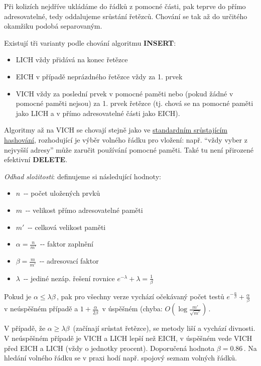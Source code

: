 Při kolizích nejdříve ukládáme do řádků z pomocné části, pak teprve do
přímo adresovatelné, tedy oddalujeme srůstání řetězců. Chování se tak až
do určitého okamžiku podobá separovaným.

Existují tři varianty podle chování algoritmu \textbf{INSERT}:

\begin{itemize}
\tightlist
\item
  LICH vždy přidává na konec řetězce
\item
  EICH v případě neprázdného řetězce vždy za 1. prvek
\item
  VICH vždy za poslední prvek v pomocné paměti nebo (pokud žádné v
  pomocné paměti nejsou) za 1. prvek řetězce (tj. chová se na pomocné
  paměti jako LICH a v přímo adresovatelné části jako EICH).
\end{itemize}

Algoritmy až na VICH se chovají stejně jako ve
\protect\hyperlink{Bez_pomocnuxe9_pamux11bti_--_LISCH_a_EISCH}{standardním
srůstajícím hashování}, rozhodující je výběr volného řádku pro vložení:
např. ``vždy vyber z nejvyšší adresy'' může zaručit používání pomocné
paměti. Také tu není přirozené efektivní \textbf{DELETE}.

\emph{Odhad složitosti}: definujeme si následující hodnoty:

\begin{itemize}
\tightlist
\item
  \(n\,\!\) -\/- počet uložených prvků
\item
  \(m\,\!\) -\/- velikost přímo adresovatelné paměti
\item
  \(m'\,\!\) -\/- celková velikost paměti
\item
  \(\alpha=\frac{n}{m'}\,\!\) -\/- faktor zaplnění
\item
  \(\beta=\frac{m}{m'}\,\!\) -\/- adresovací faktor
\item
  \(\lambda\,\!\) -\/- jediné nezáp. řešení rovnice
  \(e^{-\lambda}+\lambda=\frac{1}{\beta}\,\!\)
\end{itemize}

Pokud je \(\alpha\leq\lambda\beta\,\!\), pak pro všechny verze vychází
očekávaný počet testů
\(e^{-\frac{\alpha}{\beta}}+\frac{\alpha}{\beta}\,\!\) v neúspěšném
případě a \(1+\frac{\alpha}{2\beta}\,\!\) v úspěšném (chyba:
\(O(\log\frac{m'}{\sqrt{m'}})\,\!\).

V případě, že \(\alpha\geq\lambda\beta\,\!\) (začínají srůstat řetězce),
se metody liší a vychází divnosti. V neúspěšném případě je VICH a LICH
lepší než EICH, v úspěšném vede VICH před EICH a LICH (vždy o jednotky
procent). Doporučená hodnota \(\beta=0.86\,\!\). Na hledání volného
řádku se v praxi hodí např. spojový seznam volných řádků.

